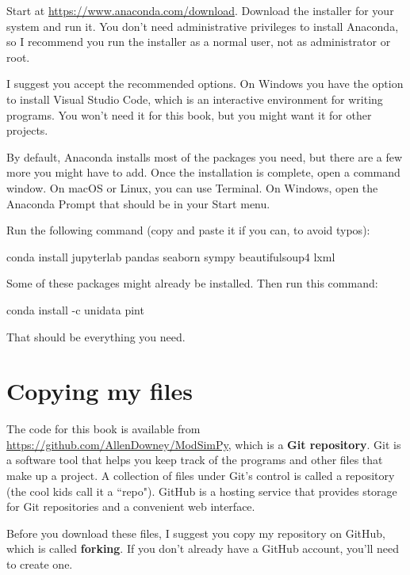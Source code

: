 \documentclass[12pt]{book}
\theoremstyle{exercise}
\begin{document}
Start at \url{https://www.anaconda.com/download}.  Download the installer for your system and run it.  You don't need administrative privileges to install Anaconda, so I recommend you run the installer as a normal user, not as administrator or root.

I suggest you accept the recommended options.
On Windows you have the option to install Visual Studio Code, which is an interactive environment for writing programs.  You won't need it for this book, but you might want it for other projects.

By default, Anaconda installs most of the packages you need, but there are a few more you might have to add.  Once the installation is complete, open a command window.  On macOS or Linux, you can use Terminal.  On Windows, open the Anaconda Prompt that should be in your Start menu.

Run the following command (copy and paste it if you can, to avoid typos):

\begin{code}
conda install jupyterlab pandas seaborn sympy beautifulsoup4 lxml
\end{code}

Some of these packages might already be installed.  Then run this command:

\begin{code}
conda install -c unidata pint
\end{code}

That should be everything you need.


\section{Copying my files}

The code for this book is available from
\url{https://github.com/AllenDowney/ModSimPy}, which is a {\bf Git repository}.  Git is a software tool that helps you keep track of the programs and other files that make up a project.  A collection of files under Git's control is called a repository (the cool kids call it a ``repo").  GitHub is a hosting service that provides storage for Git repositories and a convenient web interface.


Before you download these files, I suggest you copy my repository on GitHub, which is called {\bf forking}.  If you don't already have a GitHub account, you'll need to create one.  
\end{document}
